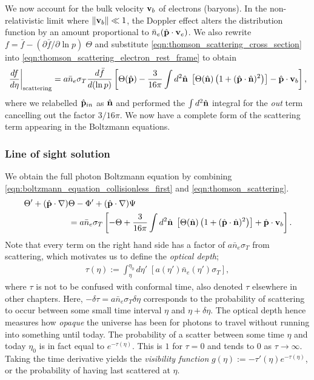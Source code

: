 We now account for the bulk velocity $\mathbf{v}_b$ of electrons (baryons). In the non-relativistic limit where $\|\mathbf{v}_b \| \ll 1$, the Doppler effect alters the distribution function by an amount proportional to $\bar{n}_e (\hat{\mathbf{p}} \cdot \mathbf{v}_e)$. We also rewrite $f = \bar{f} - (\partial\bar{f}/\partial\ln p) \; \Theta$ and substitute \eqref{eqn:thomson_scattering_cross_section} into \eqref{eqn:thomson_scattering_electron_rest_frame} to obtain
\begin{align}
	\left. \frac{df}{d\eta} \right|_\text{scattering} = a \bar{n}_e \sigma_T \frac{d\bar{f}}{d(\ln p)}  \left[ \Theta(\hat{\mathbf{p}}) - \frac{3}{16\pi} \int d^2 \hat{\mathbf{n}} \; \left[ \Theta(\hat{\mathbf{n}}) \left( 1 + (\hat{\mathbf{p}} \cdot \hat{\mathbf{n}})^2 \right) \right] - \hat{\mathbf{p}} \cdot \mathbf{v}_b \right], \label{eqn:thomson_scattering}
\end{align}
where we relabelled $\hat{\mathbf{p}}_{in}$ as $\hat{\mathbf{n}}$ and performed the $\int d^2\hat{\mathbf{n}}$ integral for the \textit{out} term cancelling out the factor $3/16\pi$. We now have a complete form of the scattering term appearing in the Boltzmann equations.


\subsubsection*{Line of sight solution} \label{section:line_of_sight_solution}

We obtain the full photon Boltzmann equation by combining \eqref{eqn:boltzmann_equation_collisionless_first} and \eqref{eqn:thomson_scattering}.
\begin{align}
	\Theta' + (\hat{\mathbf{p}} \cdot \nabla) &\Theta - \Phi' +(\hat{\mathbf{p}} \cdot \nabla) \Psi  \nonumber \\	
	&= a \bar{n}_e \sigma_T \left[ -\Theta + \frac{3}{16\pi} \int d^2 \hat{\mathbf{n}} \; \left[ \Theta(\hat{\mathbf{n}}) \left( 1 + (\hat{\mathbf{p}} \cdot \hat{\mathbf{n}})^2 \right) \right] + \hat{\mathbf{p}} \cdot \mathbf{v}_b \right]. \label{eqn:boltzmann_equation_1}
\end{align}
Note that every term on the right hand side has a factor of $a\bar{n}_e \sigma_T$ from scattering, which motivates us to define the \textit{optical depth};
\begin{align}
	\tau(\eta) := \int_\eta^{\eta_0} d\eta'\; \left[ a(\eta') \bar{n}_e (\eta') \sigma_T \right],
\end{align}
where $\tau$ is not to be confused with conformal time, also denoted $\tau$ elsewhere in other chapters. Here, $-\delta\tau = a\bar{n}_e \sigma_T \delta\eta$ corresponds to the probability of scattering to occur between some small time interval $\eta$ and $\eta+\delta\eta$. The optical depth hence measures how \textit{opaque} the universe has been for photons to travel without running into something until today. The probability of a scatter between some time $\eta$ and today $\eta_0$ is in fact equal to $e^{-\tau(\eta)}$. This is $1$ for $\tau=0$ and tends to $0$ as $\tau\rightarrow\infty$. Taking the time derivative yields the \textit{visibility function} $g(\eta):=-\tau'(\eta) e^{-\tau(\eta)}$, or the probability of having last scattered at $\eta$.

